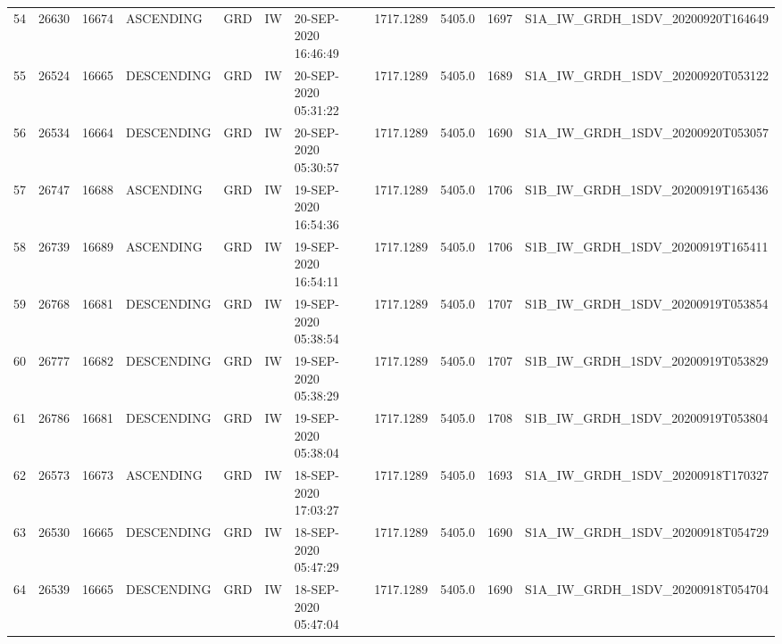 \begin{tabular}{lrrllllllll}
54  &  26630 &   16674 &   ASCENDING &          GRD &              IW &  20-SEP-2020 16:46:49 &                  1717.1289 &          5405.0 &       1697 &  S1A\_IW\_GRDH\_1SDV\_20200920T164649 \\
55  &  26524 &   16665 &  DESCENDING &          GRD &              IW &  20-SEP-2020 05:31:22 &                  1717.1289 &          5405.0 &       1689 &  S1A\_IW\_GRDH\_1SDV\_20200920T053122 \\
56  &  26534 &   16664 &  DESCENDING &          GRD &              IW &  20-SEP-2020 05:30:57 &                  1717.1289 &          5405.0 &       1690 &  S1A\_IW\_GRDH\_1SDV\_20200920T053057 \\
57  &  26747 &   16688 &   ASCENDING &          GRD &              IW &  19-SEP-2020 16:54:36 &                  1717.1289 &          5405.0 &       1706 &  S1B\_IW\_GRDH\_1SDV\_20200919T165436 \\
58  &  26739 &   16689 &   ASCENDING &          GRD &              IW &  19-SEP-2020 16:54:11 &                  1717.1289 &          5405.0 &       1706 &  S1B\_IW\_GRDH\_1SDV\_20200919T165411 \\
59  &  26768 &   16681 &  DESCENDING &          GRD &              IW &  19-SEP-2020 05:38:54 &                  1717.1289 &          5405.0 &       1707 &  S1B\_IW\_GRDH\_1SDV\_20200919T053854 \\
60  &  26777 &   16682 &  DESCENDING &          GRD &              IW &  19-SEP-2020 05:38:29 &                  1717.1289 &          5405.0 &       1707 &  S1B\_IW\_GRDH\_1SDV\_20200919T053829 \\
61  &  26786 &   16681 &  DESCENDING &          GRD &              IW &  19-SEP-2020 05:38:04 &                  1717.1289 &          5405.0 &       1708 &  S1B\_IW\_GRDH\_1SDV\_20200919T053804 \\
62  &  26573 &   16673 &   ASCENDING &          GRD &              IW &  18-SEP-2020 17:03:27 &                  1717.1289 &          5405.0 &       1693 &  S1A\_IW\_GRDH\_1SDV\_20200918T170327 \\
63  &  26530 &   16665 &  DESCENDING &          GRD &              IW &  18-SEP-2020 05:47:29 &                  1717.1289 &          5405.0 &       1690 &  S1A\_IW\_GRDH\_1SDV\_20200918T054729 \\
64  &  26539 &   16665 &  DESCENDING &          GRD &              IW &  18-SEP-2020 05:47:04 &                  1717.1289 &          5405.0 &       1690 &  S1A\_IW\_GRDH\_1SDV\_20200918T054704 \\

\end{tabular}
